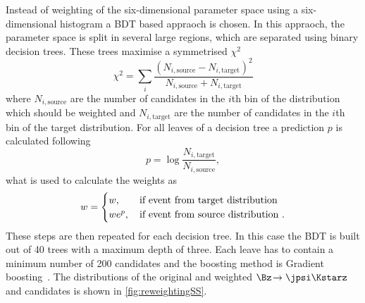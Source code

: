 Instead of weighting of the six-dimensional parameter space using a six-dimensional histogram a BDT based appraoch is chosen.
In this appraoch, the parameter space is split in several large regions, which are separated using binary decision trees.
These trees maximise a symmetrised $\chi^2$
\begin{equation}
\chi^2=\sum_{i}\frac{\left(N_{i,\text{source}}-N_{i,\text{target}}\right)^2}{N_{i,\text{source}}+N_{i,\text{target}}}
\end{equation}
where $N_{i,\text{source}}$ are the number of candidates in the $i$th bin of the distribution which should be weighted and $N_{i,\text{target}}$ are the number of candidates in the $i$th bin of the target distribution.
For all leaves of a decision tree a prediction $p$ is calculated following
\begin{equation}
p=\log\frac{N_{i,\text{target}}}{N_{i,\text{source}}},
\end{equation}
what is used to calculate the weights as
\begin{equation}
w=\begin{cases} w, &\, \text{if event from target distribution}\\ we^{p}, &\, \text{if event from source distribution\,\,.} \end{cases}
\end{equation}
These steps are then repeated for each decision tree.
In this case the BDT is built out of \num{40} trees with a maximum depth of three.
Each leave has to contain a minimum number of \num{200} candidates and the boosting method is Gradient boosting~\cite{Friedman00greedyfunction}.
The distributions of the original and weighted $\Bz\!\to\jpsi\Kstarz$ and \BdToDpi candidates is shown in \cref{fig:reweightingSS}.
